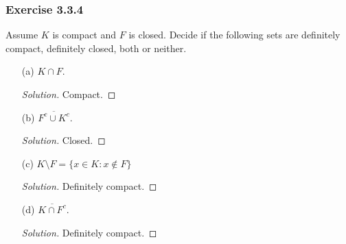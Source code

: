 \subsubsection{Exercise 3.3.4} Assume \( K  \) is compact and \( F \) is closed. Decide if the following sets are definitely compact, definitely closed, both or neither.

\begin{enumerate}
    \item[(a)] \( K \cap F \).
        \begin{proof}[Solution]
            Compact.
        \end{proof}
    \item[(b)] \( \overline{F^c \cup K^c} \).
        \begin{proof}[Solution]
            Closed.
        \end{proof}
    \item[(c)] \( K \setminus F = \{ x \in K : x \notin F \}  \)
        \begin{proof}[Solution]
        Definitely compact.
        \end{proof}
    \item[(d)] \( \overline{K \cap F^c} \).
        \begin{proof}[Solution]
        Definitely compact.
        \end{proof}
\end{enumerate}

